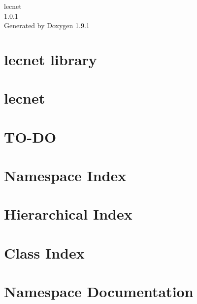 \let\mypdfximage\pdfximage\def\pdfximage{\immediate\mypdfximage}\documentclass[twoside]{book}
\newcommand{\+}{\discretionary{\mbox{\scriptsize$\hookleftarrow$}}{}{}}
\newcommand{\clearemptydoublepage}{%
  \newpage{\pagestyle{empty}\cleardoublepage}%
}
\begin{document}
\raggedbottom

\hypersetup{pageanchor=false,
             bookmarksnumbered=true,
             pdfencoding=unicode
            }
\begin{titlepage}
\vspace*{7cm}
\begin{center}%
{\Large lecnet \\[1ex]\large 1.\+0.\+1 }\\
\vspace*{1cm}
{\large Generated by Doxygen 1.9.1}\\
\end{center}
\end{titlepage}
\clearemptydoublepage
{}
\tableofcontents
\clearemptydoublepage
{}
\hypersetup{pageanchor=true}

\chapter{lecnet library}
\label{md__l_i_c_e_n_s_e}

\chapter{lecnet}
\label{md__r_e_a_d_m_e}

\chapter{TO-\/\+DO}
\label{md__t_o__d_o}

\chapter{Namespace Index}

\chapter{Hierarchical Index}

\chapter{Class Index}

\chapter{Namespace Documentation}



\end{document}
